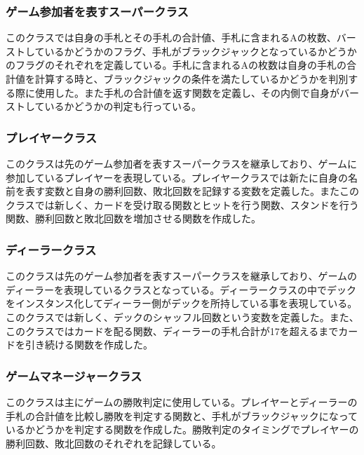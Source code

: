 \subsubsection{ゲーム参加者を表すスーパークラス}
このクラスでは自身の手札とその手札の合計値、手札に含まれるAの枚数、バーストしているかどうかのフラグ、手札がブラックジャックとなっているかどうかのフラグのそれぞれを定義している。手札に含まれるAの枚数は自身の手札の合計値を計算する時と、ブラックジャックの条件を満たしているかどうかを判別する際に使用した。また手札の合計値を返す関数を定義し、その内側で自身がバーストしているかどうかの判定も行っている。

\subsubsection{プレイヤークラス}
このクラスは先のゲーム参加者を表すスーパークラスを継承しており、ゲームに参加しているプレイヤーを表現している。プレイヤークラスでは新たに自身の名前を表す変数と自身の勝利回数、敗北回数を記録する変数を定義した。またこのクラスでは新しく、カードを受け取る関数とヒットを行う関数、スタンドを行う関数、勝利回数と敗北回数を増加させる関数を作成した。

\subsubsection{ディーラークラス}
このクラスは先のゲーム参加者を表すスーパークラスを継承しており、ゲームのディーラーを表現しているクラスとなっている。ディーラークラスの中でデックをインスタンス化してディーラー側がデックを所持している事を表現している。このクラスでは新しく、デックのシャッフル回数という変数を定義した。また、このクラスではカードを配る関数、ディーラーの手札合計が17を超えるまでカードを引き続ける関数を作成した。

\subsubsection{ゲームマネージャークラス}
このクラスは主にゲームの勝敗判定に使用している。プレイヤーとディーラーの手札の合計値を比較し勝敗を判定する関数と、手札がブラックジャックになっているかどうかを判定する関数を作成した。勝敗判定のタイミングでプレイヤーの勝利回数、敗北回数のそれぞれを記録している。

